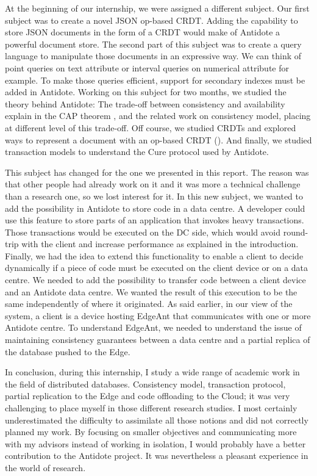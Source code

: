 \documentclass[11pt]{article}
\begin{document}
At the beginning of our internship, we were assigned a different subject. Our
first subject was to create a novel JSON op-based CRDT. Adding the capability
to store JSON documents in the form of a CRDT would make of Antidote a
powerful document store. The second part of this subject was to create a query
language to manipulate those documents in an expressive way. We can think of
point queries on text attribute or interval queries on numerical attribute for
example. To make those queries efficient, support for secondary indexes must
be added in Antidote. Working on this subject for two months, we studied the
theory behind Antidote: The trade-off between consistency and availability
explain in the CAP theorem \cite{CAP:1}, and the related work on consistency
model, placing at different level of this trade-off. Off course, we studied
CRDTs and explored ways to represent a document with an op-based CRDT
(\cite{Martin2012,Kleppmann2016}). And finally, we studied transaction models
to understand the Cure protocol used by Antidote.

This subject has changed for the one we presented in this report. The reason
was that other people had already work on it and it was more a technical
challenge than a research one, so we lost interest for it. In this new
subject, we wanted to add the possibility in Antidote to store code in a data
centre. A developer could use this feature to store parts of an application
that invokes heavy transactions. Those transactions would be executed on the
DC side, which would avoid round-trip with the client and increase performance
as explained in the introduction. Finally, we had the idea to extend this
functionality to enable a client to decide dynamically if a piece of code must
be executed on the client device or on a data centre. We needed to add the
possibility to transfer code between a client device and an Antidote data
centre. We wanted the result of this execution to be the same independently of
where it originated. As said earlier, in our view of the system, a client is a
device hosting EdgeAnt that communicates with one or more Antidote centre. To
understand EdgeAnt, we needed to understand the issue of maintaining
consistency guarantees between a data centre and a partial replica of the
database pushed to the Edge.

In conclusion, during this internship, I study a wide range of academic work
in the field of distributed databases. Consistency model, transaction
protocol, partial replication to the Edge and code offloading to the Cloud; it
was very challenging to place myself in those different research studies. I
most certainly underestimated the difficulty to assimilate all those notions
and did not correctly planned my work. By focusing on smaller objectives and
communicating more with my advisors instead of working in isolation, I would
probably have a better contribution to the Antidote project. It was
nevertheless a pleasant experience in the world of research.

\newpage

\end{document}

